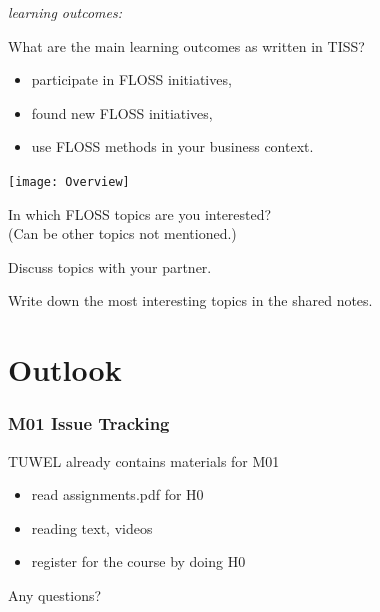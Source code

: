 \begin{frame}
	\textit{learning outcomes:}

	\begin{quest}
	What are the main learning outcomes as written in TISS?
	\end{quest}

	\pause

	\begin{itemize}
		\item participate in FLOSS initiatives,
		\item found new FLOSS initiatives,
		\item use FLOSS methods in your business context.
	\end{itemize}
\end{frame}


\begin{frame}
	\texttt{[image: Overview]}
\end{frame}

\begin{assignment}
	In which FLOSS topics are you interested? \\
	(Can be other topics not mentioned.)

	\begin{task}[1]
	Discuss topics with your partner.
	\end{task}

	\begin{task}[2]
	Write down the most interesting topics in the shared notes.
	\end{task}
\end{assignment}


\section{Outlook}

\begin{frame}
	\frametitle{M01 Issue Tracking}
	TUWEL already contains materials for M01
	\begin{task}
	\begin{itemize}
		\item read assignments.pdf for H0
		\item reading text, videos
		\item register for the course by doing H0
	\end{itemize}
	\end{task}

	\pause[\thebeamerpauses]

	\begin{task}
	Any questions?
	\end{task}
\end{frame}




\nocite{raab2017introducing}

\appendix

\begin{frame}[allowframebreaks]
	
	
\end{frame}




